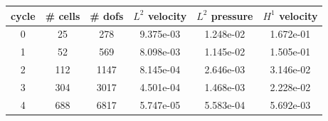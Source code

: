 \documentclass[10pt]{report}
\begin{document}
\begin{table}[H]
\begin{center}
\begin{tabular}{|c|c|c|c|c|c|} \hline
cycle & \# cells & \# dofs & $L^2$ velocity & $L^2$ pressure & $H^1$ velocity\\ \hline
0 & 25 & 278 & 9.375e-03 & 1.248e-02 & 1.672e-01\\ \hline
1 & 52 & 569 & 8.098e-03 & 1.145e-02 & 1.505e-01\\ \hline
2 & 112 & 1147 & 8.145e-04 & 2.646e-03 & 3.146e-02\\ \hline
3 & 304 & 3017 & 4.501e-04 & 1.468e-03 & 2.228e-02\\ \hline
4 & 688 & 6817 & 5.747e-05 & 5.583e-04 & 5.692e-03\\ \hline
\end{tabular}
\end{center}
\end{table}
\end{document}
